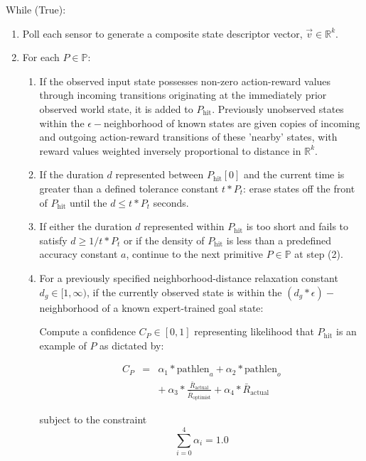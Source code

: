 \documentclass[letterpaper]{article}
\begin{document}
\noindent While (True):
\begin{enumerate}
\item
Poll each sensor to generate a composite state descriptor vector, $\vec{v} \in \mathbb{R}^k$.
\item
For each $P \in \mathbb{P}$:
\begin{enumerate}
\item
If the observed input state possesses non-zero action-reward values through incoming transitions originating at the immediately prior observed world state, it is added to $P_{\mathrm{hit}}$. Previously unobserved states within the $\epsilon-$neighborhood of known states are given copies of incoming and outgoing action-reward transitions of these 'nearby' states, with reward values weighted inversely proportional to distance in $\mathbb{R}^k$.
\item
If the duration $d$ represented between $P_{\mathrm{hit}}[0]$ and the current time is greater than a defined tolerance constant $t * P_t$: erase states off the front of $P_{\mathrm{hit}}$ until the $d \leq t *P_t$ seconds.
\item
If either the duration $d$ represented within $P_{\mathrm{hit}}$ is too short and fails to satisfy $d \geq 1/t * P_t$ or if the density of $P_{\mathrm{hit}}$ is less than a predefined accuracy constant $a$, continue to the next primitive $P \in \mathbb{P}$ at step (2).
\item
For a previously specified neighborhood-distance relaxation constant $d_g \in [1,\infty)$, if the currently observed state is within the $(d_g * \epsilon)-$neighborhood of a known expert-trained goal state:

Compute a confidence $C_P \in [0,1]$ representing likelihood that $P_{\mathrm{hit}}$ is an example of $P$ as dictated by:


$$ \begin{array} {lcl} C_P & = & \alpha_1*\mathrm{pathlen}_{a} + \alpha_2*\mathrm{pathlen}_{o} \\ 
&  & +\ \alpha_3* \frac{\bar{R}_{\mathrm{actual}}}{\bar{R}_{\mathrm{optimist}}} + \alpha_4*\bar{R}_{\mathrm{actual}} \end{array} $$

subject to the constraint
$$\sum_{i=0}^{4}\alpha_i = 1.0 $$


\end{enumerate}
\end{enumerate}
\end{document}

